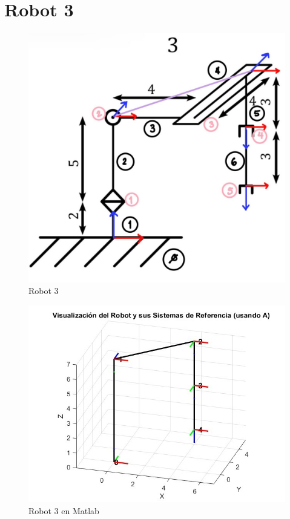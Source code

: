 \section{Robot 3}

\begin{figure}
	\centering
	\includegraphics[width=0.5\linewidth]{img/Robot3_1}
	\caption{Robot 3}
	\label{fig:robot3}
\end{figure}


\begin{figure}
	\centering
	\includegraphics[width=0.7\linewidth]{img/Robot3}
	\caption{Robot 3 en Matlab}
	\label{fig:robot_3}
\end{figure}
